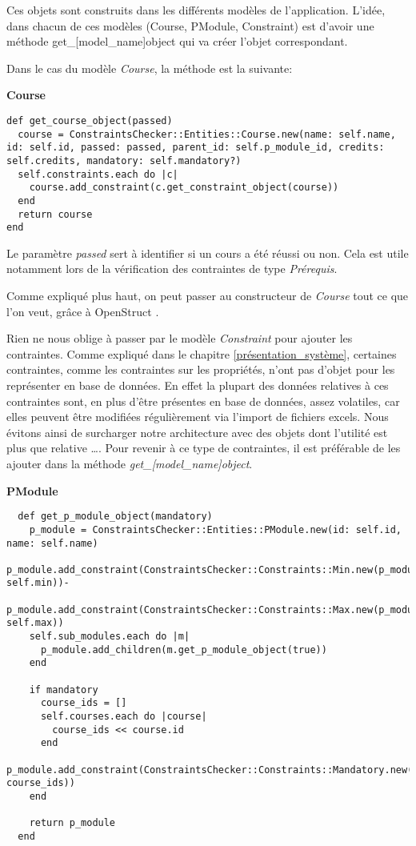 Ces objets sont construits dans les différents modèles de l'application. L'idée, dans chacun de ces modèles (Course, PModule, Constraint) est d'avoir une méthode get\_[model\_name]object qui va créer l'objet correspondant.

Dans le cas du modèle \textit{Course}, la méthode est la suivante:


\textbf{Course}

\begin{lstlisting}
def get_course_object(passed)
  course = ConstraintsChecker::Entities::Course.new(name: self.name, id: self.id, passed: passed, parent_id: self.p_module_id, credits: self.credits, mandatory: self.mandatory?)
  self.constraints.each do |c|
    course.add_constraint(c.get_constraint_object(course))
  end
  return course
end
\end{lstlisting}


Le paramètre \textit{passed} sert à identifier si un cours a été réussi ou non. Cela est utile notamment lors de la vérification des contraintes de type \textit{Prérequis}.

Comme expliqué plus haut, on peut passer au constructeur de \textit{Course} tout ce que l'on veut, grâce à OpenStruct \cite{OpenStruct}.

Rien ne nous oblige à passer par le modèle \textit{Constraint} pour ajouter les contraintes. Comme expliqué dans le chapitre \ref{présentation_système}, certaines contraintes, comme les contraintes sur les propriétés,  n'ont pas d'objet pour les représenter en base de données. En effet la plupart des données relatives à ces contraintes sont, en plus d'être présentes en base de données, assez volatiles, car elles peuvent être modifiées régulièrement via l'import de fichiers excels. Nous évitons ainsi de surcharger notre architecture avec des objets dont l'utilité est plus que relative \ldots. Pour revenir à ce type de contraintes, il est préférable de les ajouter dans la méthode \textit{get\_[model\_name]object}.

\textbf{PModule}

\begin{lstlisting}
  def get_p_module_object(mandatory)
    p_module = ConstraintsChecker::Entities::PModule.new(id: self.id, name: self.name)
    p_module.add_constraint(ConstraintsChecker::Constraints::Min.new(p_module, self.min))-
    p_module.add_constraint(ConstraintsChecker::Constraints::Max.new(p_module, self.max))
    self.sub_modules.each do |m|
      p_module.add_children(m.get_p_module_object(true))
    end

    if mandatory
      course_ids = []
      self.courses.each do |course|
        course_ids << course.id
      end
      p_module.add_constraint(ConstraintsChecker::Constraints::Mandatory.new(p_module, course_ids))
    end

    return p_module
  end
\end{lstlisting}

